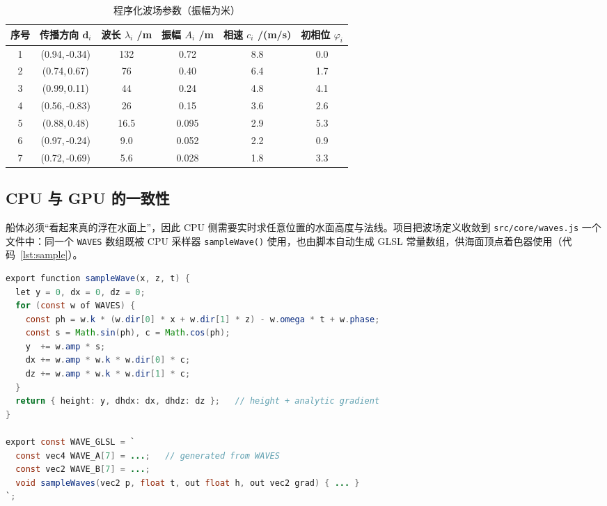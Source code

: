 \documentclass[UTF8, a4paper, 11pt]{ctexart}
\newcommand{\file}[1]{\texttt{#1}}
\begin{document}
\begin{table}[H]
\centering
\caption{程序化波场参数（振幅为米）}
\label{tab:waves}
\small
\begin{tabular}{@{}cccccc@{}}
\toprule
\textbf{序号} & \textbf{传播方向} $\mathbf{d}_i$ & \textbf{波长} $\lambda_i$ /m & \textbf{振幅} $A_i$ /m & \textbf{相速} $c_i$ /(m/s) & \textbf{初相位} $\varphi_i$ \\
\midrule
1 & (0.94,\,-0.34) & 132 & 0.72 & 8.8 & 0.0 \\
2 & (0.74,\,0.67)  & 76  & 0.40 & 6.4 & 1.7 \\
3 & (0.99,\,0.11)  & 44  & 0.24 & 4.8 & 4.1 \\
4 & (0.56,\,-0.83) & 26  & 0.15 & 3.6 & 2.6 \\
5 & (0.88,\,0.48)  & 16.5& 0.095& 2.9 & 5.3 \\
6 & (0.97,\,-0.24) & 9.0 & 0.052& 2.2 & 0.9 \\
7 & (0.72,\,-0.69) & 5.6 & 0.028& 1.8 & 3.3 \\
\bottomrule
\end{tabular}
\end{table}

\subsection{CPU 与 GPU 的一致性}

船体必须“看起来真的浮在水面上”，因此 CPU 侧需要实时求任意位置的水面高度与法线。项目把波场定义收敛到 \file{src/core/waves.js} 一个文件中：同一个 \texttt{WAVES} 数组既被 CPU 采样器 \texttt{sampleWave()} 使用，也由脚本自动生成 GLSL 常量数组，供海面顶点着色器使用（代码~\ref{lst:sample}）。

\begin{lstlisting}[language=Java, caption={共享波场：CPU 采样器与 GLSL 生成}, label={lst:sample}]
export function sampleWave(x, z, t) {
  let y = 0, dx = 0, dz = 0;
  for (const w of WAVES) {
    const ph = w.k * (w.dir[0] * x + w.dir[1] * z) - w.omega * t + w.phase;
    const s = Math.sin(ph), c = Math.cos(ph);
    y  += w.amp * s;
    dx += w.amp * w.k * w.dir[0] * c;
    dz += w.amp * w.k * w.dir[1] * c;
  }
  return { height: y, dhdx: dx, dhdz: dz };   // height + analytic gradient
}

export const WAVE_GLSL = `
  const vec4 WAVE_A[7] = ...;   // generated from WAVES
  const vec2 WAVE_B[7] = ...;
  void sampleWaves(vec2 p, float t, out float h, out vec2 grad) { ... }
`;
\end{lstlisting}
\end{document}
